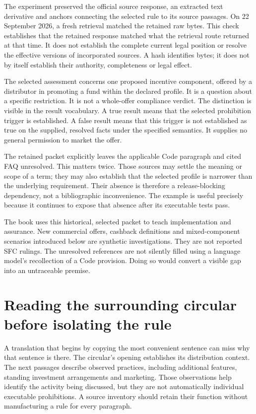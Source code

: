 \documentclass[12pt,a4paper,oneside,openany]{book}
\begin{document}
The experiment preserved the official source response, an extracted text
derivative and anchors connecting the selected rule to its source passages.
On 22 September 2026, a fresh retrieval matched the retained raw bytes. This
check establishes that the retained response matched what the retrieval route
returned at that time. It does not establish the complete current legal position
or resolve the effective versions of incorporated sources. A hash identifies
bytes; it does not by itself establish their authority, completeness or legal
effect.

The selected assessment concerns one proposed incentive component, offered by a
distributor in promoting a fund within the declared profile. It is a question
about a specific restriction. It is not a whole-offer compliance verdict. The
distinction is visible in the result vocabulary. A true result means that the
selected prohibition trigger is established. A false result means that this
trigger is not established as true on the supplied, resolved facts under the
specified semantics. It supplies no general permission to market the offer.

The retained packet explicitly leaves the applicable Code paragraph and cited
FAQ unresolved. This matters twice. Those sources may settle the meaning or
scope of a term; they may also establish that the selected profile is narrower
than the underlying requirement. Their absence is therefore a release-blocking
dependency, not a bibliographic inconvenience. The example is useful precisely
because it continues to expose that absence after its executable tests pass.

The book uses this historical, selected packet to teach implementation and
assurance. New commercial offers, cashback definitions and mixed-component
scenarios introduced below are synthetic investigations. They are not reported
SFC rulings. The unresolved references are not silently filled using a language
model's recollection of a Code provision. Doing so would convert a visible gap
into an untraceable premise.

\section{Reading the surrounding circular before isolating the rule}
\label{sec:circular-context}
A translation that begins by copying the most convenient sentence can miss why
that sentence is there. The circular's opening establishes its distribution
context. The next passages describe observed practices, including additional
features, standing investment arrangements and marketing. Those observations
help identify the activity being discussed, but they are not automatically
individual executable prohibitions. A source inventory should retain their
function without manufacturing a rule for every paragraph.
\end{document}
